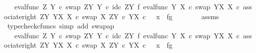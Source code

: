 \begin{isabellebody}
\ {\isachardoublequoteopen}{\isachardot}{\kern0pt}{\isachardot}{\kern0pt}{\isachardot}{\kern0pt}\ {\isacharequal}{\kern0pt}\ {\isacharparenleft}{\kern0pt}eval{\isacharunderscore}{\kern0pt}func\ Z\ Y\ {\isasymcirc}\isactrlsub c\ swap\ {\isacharparenleft}{\kern0pt}Z\isactrlbsup Y\isactrlesup {\isacharparenright}{\kern0pt}\ Y\ {\isasymcirc}\isactrlsub c\ {\isacharparenleft}{\kern0pt}id\isactrlsub c\ {\isacharparenleft}{\kern0pt}Z\isactrlbsup Y\isactrlesup {\isacharparenright}{\kern0pt}\ {\isasymtimes}\isactrlsub f\ eval{\isacharunderscore}{\kern0pt}func\ Y\ X\ {\isasymcirc}\isactrlsub c\ swap\ {\isacharparenleft}{\kern0pt}Y\isactrlbsup X\isactrlesup {\isacharparenright}{\kern0pt}\ X{\isacharparenright}{\kern0pt}\ {\isasymcirc}\isactrlsub c\ associate{\isacharunderscore}{\kern0pt}right\ {\isacharparenleft}{\kern0pt}Z\isactrlbsup Y\isactrlesup {\isacharparenright}{\kern0pt}\ {\isacharparenleft}{\kern0pt}Y\isactrlbsup X\isactrlesup {\isacharparenright}{\kern0pt}\ X{\isacharparenright}{\kern0pt}\ {\isasymcirc}\isactrlsub c\ swap\ X\ {\isacharparenleft}{\kern0pt}Z\isactrlbsup Y\isactrlesup \ {\isasymtimes}\isactrlsub c\ Y\isactrlbsup X\isactrlesup {\isacharparenright}{\kern0pt}\ {\isasymcirc}\isactrlsub c\ \ \ {\isasymlangle}x{\isacharcomma}{\kern0pt}\ \ {\isasymlangle}f{\isacharcomma}{\kern0pt}g{\isasymrangle}{\isasymrangle}{\isachardoublequoteclose}\isanewline
\ \ \ \ \ \ \isamarkupfalse%
\ assms\ \isamarkupfalse%
\ {\isacharparenleft}{\kern0pt}typecheck{\isacharunderscore}{\kern0pt}cfuncs{\isacharcomma}{\kern0pt}\ simp\ add{\isacharcolon}{\kern0pt}\ swap{\isacharunderscore}{\kern0pt}ap{\isacharparenright}{\kern0pt}\isanewline
\ \ \ \ \isamarkupfalse%
\ \isamarkupfalse%
\ {\isachardoublequoteopen}{\isachardot}{\kern0pt}{\isachardot}{\kern0pt}{\isachardot}{\kern0pt}\ {\isacharequal}{\kern0pt}\ {\isacharparenleft}{\kern0pt}eval{\isacharunderscore}{\kern0pt}func\ Z\ Y\ {\isasymcirc}\isactrlsub c\ swap\ {\isacharparenleft}{\kern0pt}Z\isactrlbsup Y\isactrlesup {\isacharparenright}{\kern0pt}\ Y\ {\isasymcirc}\isactrlsub c\ {\isacharparenleft}{\kern0pt}id\isactrlsub c\ {\isacharparenleft}{\kern0pt}Z\isactrlbsup Y\isactrlesup {\isacharparenright}{\kern0pt}\ {\isasymtimes}\isactrlsub f\ eval{\isacharunderscore}{\kern0pt}func\ Y\ X\ {\isasymcirc}\isactrlsub c\ swap\ {\isacharparenleft}{\kern0pt}Y\isactrlbsup X\isactrlesup {\isacharparenright}{\kern0pt}\ X{\isacharparenright}{\kern0pt}\ {\isasymcirc}\isactrlsub c\ associate{\isacharunderscore}{\kern0pt}right\ {\isacharparenleft}{\kern0pt}Z\isactrlbsup Y\isactrlesup {\isacharparenright}{\kern0pt}\ {\isacharparenleft}{\kern0pt}Y\isactrlbsup X\isactrlesup {\isacharparenright}{\kern0pt}\ X\ {\isasymcirc}\isactrlsub c\ swap\ X\ {\isacharparenleft}{\kern0pt}Z\isactrlbsup Y\isactrlesup \ {\isasymtimes}\isactrlsub c\ Y\isactrlbsup X\isactrlesup {\isacharparenright}{\kern0pt}{\isacharparenright}{\kern0pt}\ {\isasymcirc}\isactrlsub c\ \ \ {\isasymlangle}x{\isacharcomma}{\kern0pt}\ \ {\isasymlangle}f{\isacharcomma}{\kern0pt}g{\isasymrangle}{\isasymrangle}{\isachardoublequoteclose}\isanewline

\end{isabellebody}
